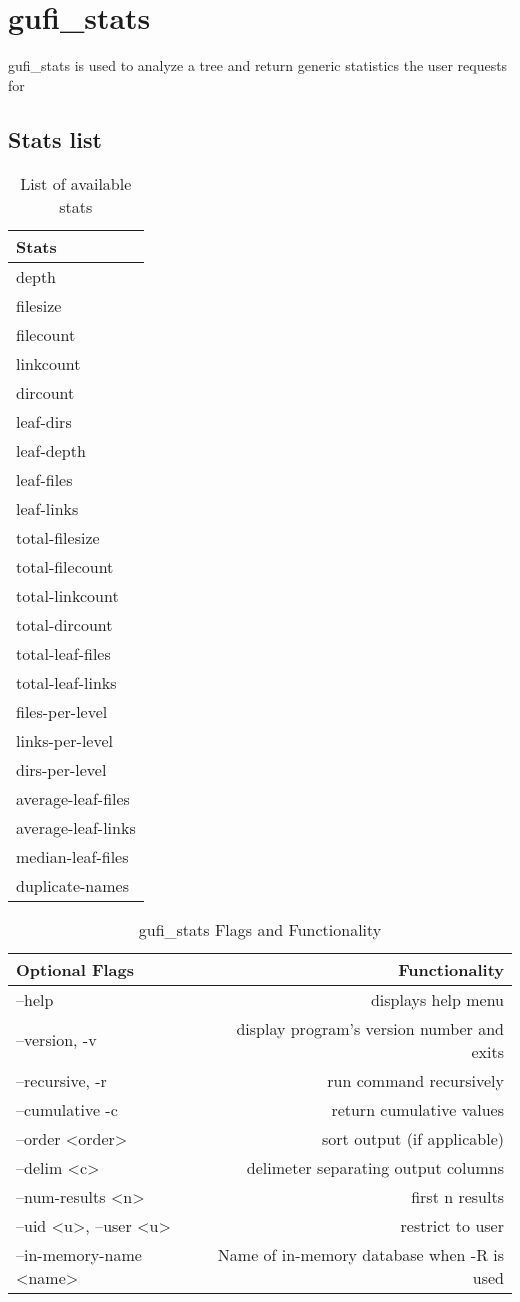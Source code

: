 \section{gufi\_stats}
gufi\_stats is used to analyze a tree and return generic statistics the user requests for

\subsection{Stats list}
\begin{table} [h]
\centering
\begin{tabular}{l}
Stats\\\hline
depth \\
filesize \\
filecount \\
linkcount \\
dircount \\
leaf-dirs \\
leaf-depth \\
leaf-files \\
leaf-links \\
total-filesize \\
total-filecount \\
total-linkcount \\
total-dircount \\
total-leaf-files \\
total-leaf-links \\
files-per-level \\ 
links-per-level \\
dirs-per-level \\
average-leaf-files \\
average-leaf-links \\ 
median-leaf-files \\
duplicate-names
\end{tabular}
\caption{\label{fig:stat_options}List of available stats}
\end{table}

\begin{table} [h]
\centering
\begin{tabular}{l|r}
Optional Flags & Functionality\\\hline
--help & displays help menu\\ 
--version, -v & display program's version number and exits \\
--recursive, -r & run command recursively \\
--cumulative -c & return cumulative values \\
--order \textless order\textgreater & sort output (if applicable)\\
--delim \textless c\textgreater & delimeter separating output columns\\
--num-results \textless n\textgreater & first n results \\
--uid \textless u\textgreater, --user \textless u\textgreater & restrict to user \\
--in-memory-name \textless name\textgreater & Name of in-memory database when -R is used
\end{tabular}
\caption{\label{fig:gufi_stats_flags}gufi\_stats Flags and Functionality}
\end{table}

